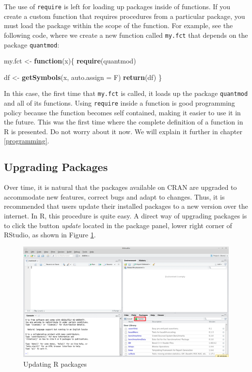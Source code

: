 \documentclass[11pt,]{book}
\newenvironment{Shaded}{\begin{snugshade}}{\end{snugshade}}
\newcommand{\KeywordTok}[1]{\textcolor[rgb]{0.27,0.27,0.27}{\textbf{#1}}}
\newcommand{\DataTypeTok}[1]{\textcolor[rgb]{0.27,0.27,0.27}{#1}}
\newcommand{\StringTok}[1]{\textcolor[rgb]{0.5,0.5,0.5}{#1}}
\newcommand{\ControlFlowTok}[1]{\textcolor[rgb]{0.13,0.29,0.53}{\textbf{#1}}}
\newcommand{\NormalTok}[1]{#1}
\begin{document}
The use of \texttt{require} is left for loading up packages inside of
functions. If you create a custom function that requires procedures from
a particular package, you must load the package within the scope of the
function. For example, see the following code, where we create a new
function called \texttt{my.fct} that depends on the package
\texttt{quantmod}:

\begin{Shaded}
\begin{Highlighting}[]
\NormalTok{my.fct <-}\StringTok{ }\ControlFlowTok{function}\NormalTok{(x)\{}
    \KeywordTok{require}\NormalTok{(quantmod)}
    
\NormalTok{    df <-}\StringTok{ }\KeywordTok{getSymbols}\NormalTok{(x, }\DataTypeTok{auto.assign =}\NormalTok{ F)}
    \KeywordTok{return}\NormalTok{(df)}
\NormalTok{\}}
\end{Highlighting}
\end{Shaded}

In this case, the first time that \texttt{my.fct} is called, it loads up
the package \texttt{quantmod} and all of its functions. Using
\texttt{require} inside a function is good programming policy because
the function becomes self contained, making it easier to use it in the
future. This was the first time where the complete definition of a
function in R is presented. Do not worry about it now. We will explain
it further in chapter \ref{programming}.

\subsection{Upgrading Packages}\label{upgrading-packages}

Over time, it is natural that the packages available on CRAN are
upgraded to accommodate new features, correct bugs and adapt to changes.
Thus, it is recommended that users update their installed packages to a
new version over the internet. In R, this procedure is quite easy. A
direct way of upgrading packages is to click the button \emph{update}
located in the package panel, lower right corner of RStudio, as shown in
Figure \ref{fig:RStudio-update}.

\begin{figure}[!htbp]

{\centering \includegraphics[width=1\linewidth]{figs/RStudio_update} 

}

\caption{Updating R packages}\label{fig:RStudio-update}
\end{figure}
\end{document}
